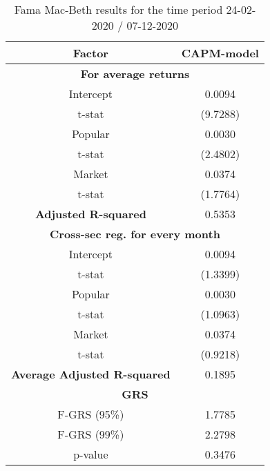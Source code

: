 \begin{table}[h!]
	\centering
	\captionsetup{skip=0.5\baselineskip}
	\caption{Fama Mac-Beth results for the time period 24-02-2020 / 07-12-2020}
	\begin{tabular}{|c|c|}
		\hline
		\textbf{Factor} & \textbf{CAPM-model} \\ \hline
		\multicolumn{2}{|c|}{\textbf{For average returns}} \\ \hline
		Intercept & 0.0094 \\ 
		t-stat & (9.7288) \\ \hline
		Popular & 0.0030 \\ 
		t-stat & (2.4802)\\ \hline
		Market & 0.0374 \\
		t-stat & (1.7764)\\ \hline
		\textbf{Adjusted R-squared} & 0.5353 \\ \hline
		\multicolumn{2}{|c|}{\textbf{Cross-sec reg. for every month}} \\ \hline
		Intercept & 0.0094 \\ 
		t-stat & (1.3399) \\ \hline
		Popular & 0.0030 \\ 
		t-stat & (1.0963)\\ \hline
		Market & 0.0374 \\
		t-stat & (0.9218)\\ \hline
		\textbf{Average Adjusted R-squared} & 0.1895 \\ \hline
		\multicolumn{2}{|c|}{\textbf{GRS}} \\ \hline
		F-GRS (95\%) & 1.7785 \\ \hline
		F-GRS (99\%) & 2.2798 \\ \hline
		p-value & 0.3476 \\ \hline
	\end{tabular}
\end{table}

